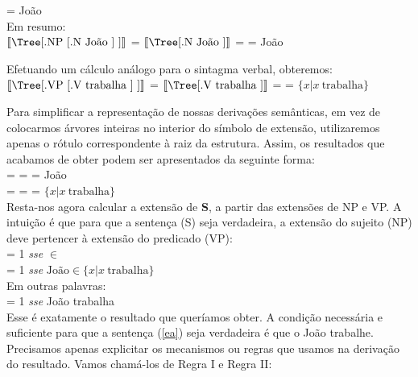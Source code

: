 \n {} = João\\

\n Em resumo:\\

$\left \llbracket \vcenter{%
	\hbox{\Tree [.NP [.N João ] ]}} \right \rrbracket$ = $\left \llbracket \vcenter{%
	\hbox{\Tree [.N João ]}} \right \rrbracket$ =  = João

\bigskip

\n Efetuando um cálculo análogo para o sintagma verbal, obteremos:\\

$\left \llbracket \vcenter{%
	\hbox{\Tree [.VP [.V trabalha ] ]}} \right \rrbracket$ = $\left \llbracket \vcenter{%
	\hbox{\Tree [.V trabalha ]}} \right \rrbracket$ =  = $\{x | x\ \text{trabalha}\}$

\bigskip

\n Para simplificar a representa\-ção de nossas deriva\-çõ\-es
semânticas, em vez de colocarmos árvores inteiras no interior do
símbolo de extensão, utilizaremos apenas o rótulo correspondente à
raiz da estrutura. Assim, os resultados que acabamos de obter
podem ser apresentados da seguinte forma:\\

\n {} =  =  = João\\

\n {} =  =  = $\{x | x\ \text{trabalha}\}$\\

\n Resta-nos agora calcular a extensão de \textbf{S}, a partir das extensões de NP e VP. A intuição é que para que a sentença (S) seja verdadeira, a extensão do sujeito (NP) deve pertencer à extensão do predicado (VP):\\

\n {} = 1 \textit{sse}  $\in$ \\

\n {} = 1 \textit{sse} $\text{João} \in \{x | x\ \text{trabalha}\}$\\

\n Em outras palavras:\\

\n {} = 1 \textit{sse} João trabalha\\

\n Esse é exatamente o resultado que queríamos obter. A condi\-ção
necessária e suficiente para que a sentença (\ref{ea}) seja
verdadeira é que o João trabalhe. Precisamos apenas explicitar os mecanismos ou regras que usamos na derivação do resultado. Vamos chamá-los de Regra I e Regra II:\\

